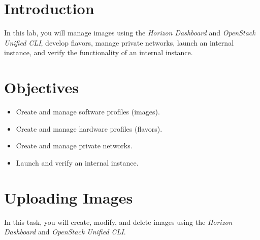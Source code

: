 \documentclass[letterpaper, 12pt]{article}
\begin{document}

\section*{Introduction}
\label{sec:introduction}
In this lab, you will manage images using the \textit{Horizon Dashboard} and \textit{OpenStack Unified CLI}, develop flavors, manage private networks, launch an internal instance, and verify the functionality of an internal instance.

\section*{Objectives}
\label{sec:objectives}
\begin{itemize}[itemsep=0pt]
    \item Create and manage software profiles (images).
    \item Create and manage hardware profiles (flavors).
    \item Create and manage private networks.
    \item Launch and verify an internal instance.
\end{itemize}

\labsettings

\section{Uploading Images}
\label{sec:uploading_images}
In this task, you will create, modify, and delete images using the \textit{Horizon Dashboard} and \textit{OpenStack Unified CLI}.
\end{document}
